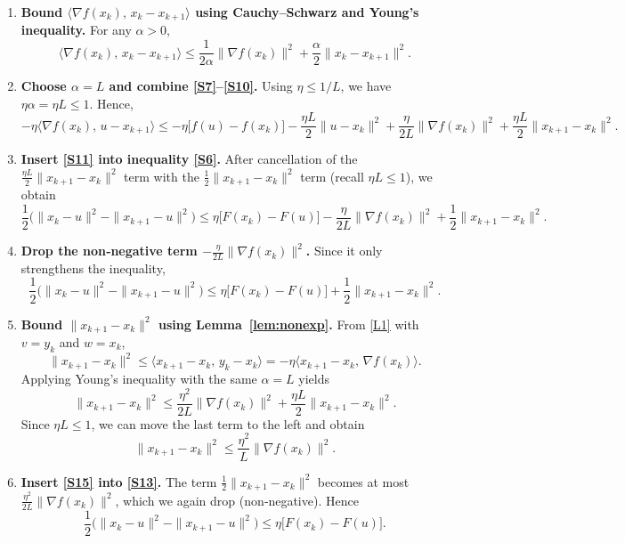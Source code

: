 \documentclass{article}
\begin{document}
\begin{enumerate}[label=[Step \arabic*], leftmargin=*]
\item \textbf{Bound $\langle\nabla f(x_{k}),\,x_{k}-x_{k+1}\rangle$ using Cauchy–Schwarz
and Young’s inequality.}  
For any $\alpha>0$,
\[
\langle\nabla f(x_{k}),\,x_{k}-x_{k+1}\rangle
\le \frac{1}{2\alpha}\|\nabla f(x_{k})\|^{2}
+\frac{\alpha}{2}\|x_{k}-x_{k+1}\|^{2}.
\tag{S10}
\]

\item \textbf{Choose $\alpha = L$ and combine \eqref{S7}–\eqref{S10}.}  
Using $\eta\le 1/L$, we have $\eta\alpha = \eta L\le1$. Hence,
\[
-\eta\langle\nabla f(x_{k}),\,u-x_{k+1}\rangle
\le -\eta\bigl[f(u)-f(x_{k})\bigr]
-\frac{\eta L}{2}\|u-x_{k}\|^{2}
+\frac{\eta}{2L}\|\nabla f(x_{k})\|^{2}
+\frac{\eta L}{2}\|x_{k+1}-x_{k}\|^{2}.
\tag{S11}
\]

\item \textbf{Insert \eqref{S11} into inequality \eqref{S6}.}  
After cancellation of the $\frac{\eta L}{2}\|x_{k+1}-x_{k}\|^{2}$ term with
the $\frac12\|x_{k+1}-x_{k}\|^{2}$ term (recall $\eta L\le1$), we obtain
\[
\frac12\bigl(\|x_{k}-u\|^{2}-\|x_{k+1}-u\|^{2}\bigr)
\le \eta\bigl[F(x_{k})-F(u)\bigr]
-\frac{\eta}{2L}\|\nabla f(x_{k})\|^{2}
+\frac12\|x_{k+1}-x_{k}\|^{2}.
\tag{S12}
\]

\item \textbf{Drop the non‑negative term $-\frac{\eta}{2L}\|\nabla f(x_{k})\|^{2}$.}  
Since it only strengthens the inequality,
\[
\frac12\bigl(\|x_{k}-u\|^{2}-\|x_{k+1}-u\|^{2}\bigr)
\le \eta\bigl[F(x_{k})-F(u)\bigr]
+\frac12\|x_{k+1}-x_{k}\|^{2}.
\tag{S13}
\]

\item \textbf{Bound $\|x_{k+1}-x_{k}\|^{2}$ using Lemma~\ref{lem:nonexp}.}  
From \eqref{L1} with $v=y_{k}$ and $w=x_{k}$,
\[
\|x_{k+1}-x_{k}\|^{2}
\le \langle x_{k+1}-x_{k},\,y_{k}-x_{k}\rangle
= -\eta\langle x_{k+1}-x_{k},\,\nabla f(x_{k})\rangle .
\tag{S14}
\]
Applying Young’s inequality with the same $\alpha=L$ yields
\[
\|x_{k+1}-x_{k}\|^{2}
\le \frac{\eta^{2}}{2L}\|\nabla f(x_{k})\|^{2}
+\frac{\eta L}{2}\|x_{k+1}-x_{k}\|^{2}.
\]
Since $\eta L\le1$, we can move the last term to the left and obtain
\[
\|x_{k+1}-x_{k}\|^{2}\le \frac{\eta^{2}}{L}\|\nabla f(x_{k})\|^{2}.
\tag{S15}
\]

\item \textbf{Insert \eqref{S15} into \eqref{S13}.}  
The term $\frac12\|x_{k+1}-x_{k}\|^{2}$ becomes at most
$\frac{\eta^{2}}{2L}\|\nabla f(x_{k})\|^{2}$, which we again drop (non‑negative). Hence
\[
\frac12\bigl(\|x_{k}-u\|^{2}-\|x_{k+1}-u\|^{2}\bigr)
\le \eta\bigl[F(x_{k})-F(u)\bigr].
\tag{S16}
\]


\end{enumerate}
\end{document}
